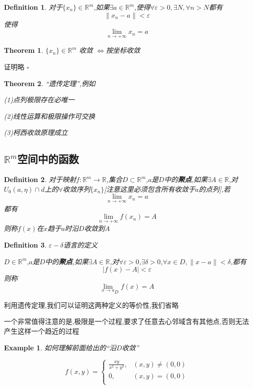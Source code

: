 \documentclass[11pt,hyperref,a4paper,UTF8]{ctexart}
\newtheorem{theorem}{Theorem}[subsection]
\newtheorem{example}{Example}[subsection]
\newtheorem{definition}{Definition}[subsection]
\newenvironment{cproof}{%
\heiti{证明}\kaishu
}{%
  \hfill $\square$
  \par\bigskip
}
\newcommand{\RR}{\mathbb{R}}
\begin{document}
\begin{CJK}{UTF8}{gkai}
\begin{definition}
  对于$\{x_n\} \in \RR^m$,如果$\exists a \in \RR^m$,使得$\forall \varepsilon > 0,\exists N ,\forall n > N$都有
  \[\|x_n - a\| < \varepsilon\]
  使得
  \[\lim_{n \to +\infty} x_n = a\]
\end{definition}

\begin{theorem}
  $\{x_n\} \in \RR^m$ 收敛 $\Leftrightarrow$按坐标收敛
\end{theorem}
\begin{cproof}
  证明略
\end{cproof}

\begin{theorem}
  ``遗传定理'',例如
  
  (1)点列极限存在必唯一

  (2)线性运算和极限操作可交换

  (3)柯西收敛原理成立
\end{theorem}

\subsection{$\RR^m$空间中的函数}
\begin{definition}
  对于映射$f: \RR^m \to \RR$,集合$D \subset \RR^m$,$a$是$D$中的\textbf{聚点},如果$\exists A \in \RR$,对$U_0(a,  \eta) \cap d$上的$\forall $收敛序列$\{x_n\}$[注意这里必须包含所有收敛于$a$的点列],若
  \[\lim_{n \to +\infty}x_n = a\]
  都有
  \[\lim_{n \to +\infty }f(x_n) = A\]
  则称$f(x)$在$x$趋于$a$时沿$D$收敛到$A$
\end{definition}

\begin{definition}
  $\varepsilon-\delta$语言的定义

  $D \in \RR^m$,$a$是$D$中的\textbf{聚点},如果$\exists A \in \RR$,对$\forall \varepsilon > 0$,$\exists \delta > 0$,$\forall x \in D, \|x - a\| < \delta$,都有
  \[|f(x) - A| < \varepsilon\]
  则称
  \[{\lim_{x \to a}}_D f(x) = A\]
\end{definition}

利用遗传定理,我们可以证明这两种定义的等价性,我们省略

一个非常值得注意的是,极限是一个过程,要求了任意去心邻域含有其他点,否则无法产生这样一个趋近的过程
\begin{example}
  如何理解前面给出的``沿$D$收敛''

  \[f(x,y) = \begin{cases}
    \frac{xy}{x^2 + y^2}, &(x,y) \neq(0,0)\\
    0, &(x,y) = (0,0)\\
  \end{cases}\]


\end{example}
\end{CJK}
\end{document}
